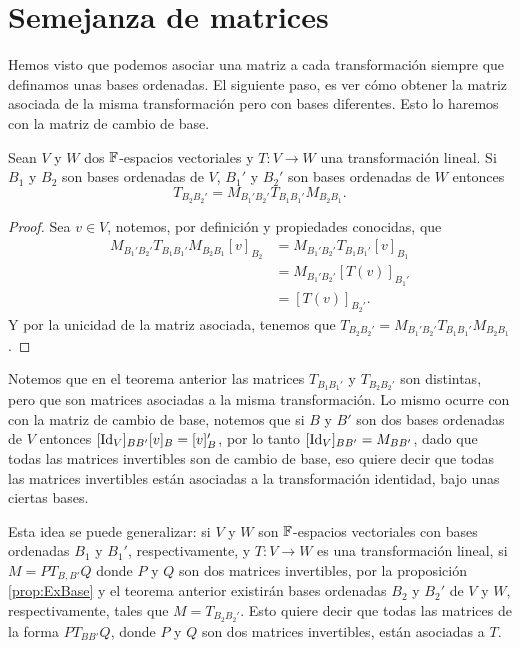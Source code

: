 \section{Semejanza de matrices}

Hemos visto que podemos asociar una matriz a cada transformación siempre que definamos unas bases ordenadas. El siguiente paso, es ver cómo obtener la matriz asociada de la misma transformación pero con bases diferentes. Esto lo haremos con la matriz de cambio de base.

\begin{teor}
  Sean $V$ y $W$ dos $\mathbb{F}$-espacios vectoriales y $T \colon V \to W$ una transformación lineal. Si $B_1$ y $B_2$ son bases ordenadas de $V$, $B_1'$ y $B_2'$ son bases ordenadas de $W$ entonces
  \[T_{B_2 B_2'} = M_{B_1' B_2'} T_{B_1 B_1'}M_{B_2 B_1}. \]
\end{teor}
\begin{proof}
  Sea $v \in V$, notemos, por definición y propiedades conocidas, que
  \begin{align*}
    M_{B_1' B_2'} T_{B_1 B_1'}M_{B_2 B_1} [v]_{B_2} &= M_{B_1' B_2'} T_{B_1 B_1'} [v]_{B_1} \\
      &= M_{B_1' B_2'} [T(v)]_{B_1'} \\
      &= [T(v)]_{B_2'}.
  \end{align*}
  Y por la unicidad de la matriz asociada, tenemos que $T_{B_2 B_2'} = M_{B_1' B_2'} T_{B_1 B_1'}M_{B_2 B_1}$.
\end{proof}

Notemos que en el teorema anterior las matrices $T_{B_1B_1'}$ y $T_{B_2B_2'}$ son distintas, pero que son matrices asociadas a la misma transformación. Lo mismo ocurre con con la matriz de cambio de base, notemos que si $B$ y $B'$ son dos bases ordenadas de $V$ entonces $[\mathrm{Id}_V]_{BB'}[v]_B = [v]_B'$, por lo tanto $[\mathrm{Id}_V]_{BB'} = M_{BB'}$, dado que todas las matrices invertibles son de cambio de base, eso quiere decir que todas las matrices invertibles están asociadas a la transformación identidad, bajo unas ciertas bases.

Esta idea se puede generalizar: si $V$ y $W$ son $\mathbb{F}$-espacios vectoriales con bases ordenadas $B_1$ y $B_1'$, respectivamente, y $T\colon V \to W$ es una transformación lineal, si $M = PT_{B,B'}Q$ donde $P$ y $Q$ son dos matrices invertibles, por la proposición \ref{prop:ExBase} y el teorema anterior existirán bases ordenadas $B_2$ y $B_2'$ de $V$ y $W$, respectivamente, tales que $M = T_{B_2 B_2'}$. Esto quiere decir que todas las matrices de la forma $PT_{BB'}Q$, donde $P$ y $Q$ son dos matrices invertibles, están asociadas a $T$.

